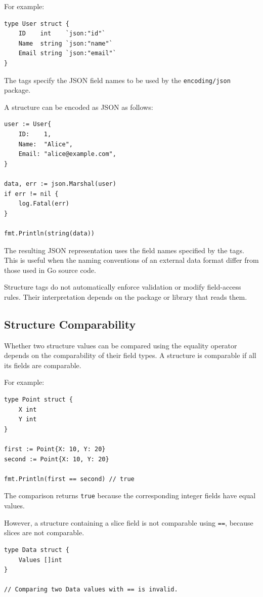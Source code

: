 For example:

\begin{lstlisting}
type User struct {
    ID    int    `json:"id"`
    Name  string `json:"name"`
    Email string `json:"email"`
}
\end{lstlisting}

The tags specify the JSON field names to be used by the \texttt{encoding/json} package.

A structure can be encoded as JSON as follows:

\begin{lstlisting}
user := User{
    ID:    1,
    Name:  "Alice",
    Email: "alice@example.com",
}

data, err := json.Marshal(user)
if err != nil {
    log.Fatal(err)
}

fmt.Println(string(data))
\end{lstlisting}

The resulting JSON representation uses the field names specified by the tags. This is useful when the naming conventions of an external data format differ from those used in Go source code.

Structure tags do not automatically enforce validation or modify field-access rules. Their interpretation depends on the package or library that reads them.

\subsection{Structure Comparability}

Whether two structure values can be compared using the equality operator depends on the comparability of their field types. A structure is comparable if all its fields are comparable.

For example:

\begin{lstlisting}
type Point struct {
    X int
    Y int
}

first := Point{X: 10, Y: 20}
second := Point{X: 10, Y: 20}

fmt.Println(first == second) // true
\end{lstlisting}

The comparison returns \texttt{true} because the corresponding integer fields have equal values.

However, a structure containing a slice field is not comparable using \texttt{==}, because slices are not comparable.

\begin{lstlisting}
type Data struct {
    Values []int
}

// Comparing two Data values with == is invalid.
\end{lstlisting}

